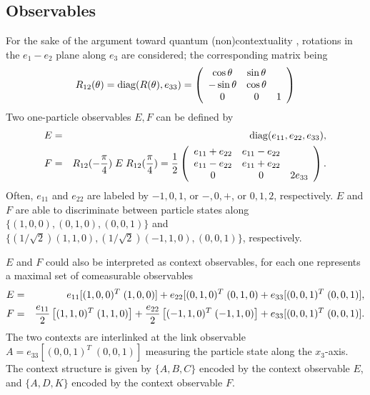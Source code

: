 \documentclass[12pt]{iopart}
\begin{document}
\subsection{Observables}
\label{2004-analog-2p3sb}
For the sake of the argument toward quantum (non)contextuality
\cite{svozil-2004-qnc}, rotations in the $e_1-e_2$ plane along $e_3$ are considered;
the corresponding matrix being
\begin{equation}
R_{12}(\theta ) =  {\rm diag}(R(\theta ),e_{33}) =
\left(
\begin{array}{cccc}
\cos \theta &\sin \theta & \\
-\sin \theta &\cos \theta &\\
0&0&1
\end{array}
\right)
\end{equation}
Two one-particle observables $E,F$ can be defined by
\begin{eqnarray}
E &=&
{\rm diag}(e_{11},e_{22},e_{33}),
\label{2004-analog-Epiover43p}
\\
F &=& R_{12}(-{\pi \over 4})\; E \; R_{12}({\pi \over 4})
=
{1\over {2}}\left(
\begin{array}{cccc}
e_{11}+e_{22}&e_{11}-e_{22}&\\
e_{11}-e_{22}&e_{11}+e_{22}&\\
0&0&2 e_{33}
\end{array}
\right) .
\label{2004-analog-Epiover4b3p}
\end{eqnarray}
Often,
$e_{11}$
and
$e_{22}$
are  labeled by $-1,0,1$, or $-,0,+$, or $0,1,2$, respectively.
$E$ and $F$ are able to discriminate between particle states along
$\{(1,0,0),(0,1,0),(0,0,1)\}$
and
$\{(1/\sqrt{2})(1,1,0),(1/\sqrt{2})(-1,1,0),(0,0,1)\}$,
respectively.

$E$ and $F$ could also be interpreted as  context observables,
for each one represents a maximal set of comeasurable observables
\begin{eqnarray}
E &=&  e_{11}[(1,0,0)^T\;(1,0,0)] + e_{22}[(0,1,0)^T\;(0,1,0) + e_{33}[(0,0,1)^T\;(0,0,1)],
\label{2004-analog-Epiover4c3}
\\
F &=&  {e_{11}\over 2}\left[(1,1,0)^T\; (1,1,0)\right]
+ {e_{22}\over 2}\left[(-1,1,0)^T\;(-1,1,0)\right]  + e_{33}[(0,0,1)^T\;(0,0,1)].
\label{2004-analog-Epiover4bc3}
\end{eqnarray}
The two contexts are  interlinked at the link observable $A = e_{33}[(0,0,1)^T\;(0,0,1)]$
measuring the particle state along the $x_3$-axis.
The context structure is given by $\{A,B,C\}$ encoded by the context observable $E$,
and $\{A,D,K\}$ encoded by the context observable $F$.
\end{document}
